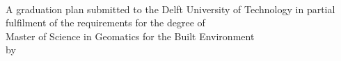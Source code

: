 \thispagestyle{empty}

\begin{titlepage}
  \begin{addmargin}[-1cm]{-3cm}
    \begin{center}  
        \hfill
        \vfill

        \begingroup
            \LARGE \color{cyan}\spacedallcaps{\myTitle}\\
        \endgroup
        \vspace{0.5cm}
        \begingroup
        \large\mySubTitle
        \endgroup
        
        \vspace{5cm}
        
        A graduation plan submitted to the Delft University of Technology in partial fulfilment of the requirements for the degree of\\
        \vspace{2cm}
        Master of Science in Geomatics for the Built Environment\\
        \vspace{4cm}
        by\\
        \bigskip
        \myName\\
        \bigskip
        \myGraduationMonth\xspace\myGraduationYear\\

        \vfill

    \end{center}  
  \end{addmargin}       
\end{titlepage}  
